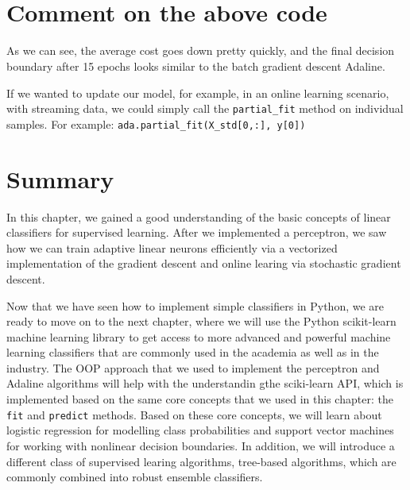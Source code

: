 \documentclass[11pt]{article}
\begin{document}
    \begin{center}
    \end{center}
    { \hspace*{\fill} \\}
    
    \begin{center}
    \end{center}
    { \hspace*{\fill} \\}
    
    \section{Comment on the above code}\label{comment-on-the-above-code}

As we can see, the average cost goes down pretty quickly, and the final
decision boundary after 15 epochs looks similar to the batch gradient
descent Adaline.

If we wanted to update our model, for example, in an online learning
scenario, with streaming data, we could simply call the
\texttt{partial\_fit} method on individual samples. For example:
\texttt{ada.partial\_fit(X\_std{[}0,:{]},\ y{[}0{]})}

    \section{Summary}\label{summary}

In this chapter, we gained a good understanding of the basic concepts of
linear classifiers for supervised learning. After we implemented a
perceptron, we saw how we can train adaptive linear neurons efficiently
via a vectorized implementation of the gradient descent and online
learing via stochastic gradient descent.

Now that we have seen how to implement simple classifiers in Python, we
are ready to move on to the next chapter, where we will use the Python
scikit-learn machine learning library to get access to more advanced and
powerful machine learning classifiers that are commonly used in the
academia as well as in the industry. The OOP approach that we used to
implement the perceptron and Adaline algorithms will help with the
understandin gthe sciki-learn API, which is implemented based on the
same core concepts that we used in this chapter: the \texttt{fit} and
\texttt{predict} methods. Based on these core concepts, we will learn
about logistic regression for modelling class probabilities and support
vector machines for working with nonlinear decision boundaries. In
addition, we will introduce a different class of supervised learing
algorithms, tree-based algorithms, which are commonly combined into
robust ensemble classifiers.


    
    
    
    
\end{document}
